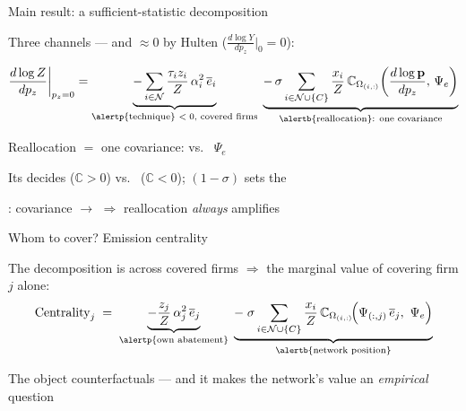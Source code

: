 \begin{frame}{Main result: a sufficient-statistic decomposition}

    Three channels --- and  $\approx 0$ by Hulten ($\tfrac{d\log Y}{dp_z}\big|_0=0$):

    \begin{tcolorbox}[colback=blue!4,colframe=blue!45!black]
    $$ \frac{d \log Z}{d p_z}\bigg|_{p_z=0}
        = \underbrace{-\sum_{i \in \N} \frac{\tau_i z_i}{Z}\,\alpha_i^2\,\overline{e}_i}_{\text{\alertp{technique} $<0$, covered firms}}
        \;\underbrace{-\,\sigma \sum_{i \in \N \cup \{C\}} \frac{x_i}{Z}\,\mathbb{C}_{\Omega_{(i,:)}}\!\left(\frac{d \log \mathbf{p}}{d p_z},\,\Psi_e\right)}_{\text{\alertb{reallocation}: one covariance}} $$
    \end{tcolorbox}

    \begin{wideitemize}
        \item Reallocation $=$ one covariance:  vs.\  $\Psi_e$
        \item Its  decides  ($\mathbb{C}>0$) vs.\  ($\mathbb{C}<0$); $(1-\sigma)$ sets the 
        \item {}: covariance $\to$  $\Rightarrow$ reallocation \emph{always} amplifies
    \end{wideitemize}

\end{frame}

\begin{frame}{Whom to cover? Emission centrality}

    \begin{wideitemize}
        \item The decomposition is  across covered firms $\Rightarrow$ the marginal value of covering firm $j$ alone:
        $$ \text{Centrality}_j \;=\; \underbrace{-\frac{z_j}{Z}\,\alpha_j^2\,\overline{e}_j}_{\text{\alertp{own abatement}}}
            \;\underbrace{-\; \sigma \sum_{i \in \N \cup \{C\}} \frac{x_i}{Z}\,\mathbb{C}_{\Omega_{(i,:)}}\!\Big(\Psi_{(:,j)}\,\overline{e}_j,\ \Psi_e\Big)}_{\text{\alertb{network position}}} $$

        \item The object counterfactuals  --- and it makes the network's value an \emph{empirical} question
    \end{wideitemize}

\end{frame}

